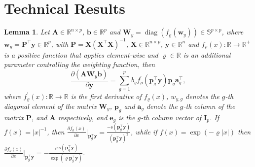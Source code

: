 \documentclass[a4paper, 12pt]{article}
\newcommand{\sgn}{\mathrm{s}}
\DeclareMathOperator{\diag}{diag}
\newcommand{\T}{\top}
\def\ba{\boldsymbol{a}}
\def\bb{\boldsymbol{b}}
\def\be{\boldsymbol{e}}
\def\bp{\boldsymbol{p}}
\def\bw{\boldsymbol{w}}
\def\by{\boldsymbol{y}}
\def\bA{\mathbf{A}}
\def\bI{\mathbf{I}}
\def\bP{\mathbf{P}}
\def\bW{\mathbf{W}}
\def\bX{\mathbf{X}}
\def\ba{\mathbf{a}}
\def\bb{\mathbf{b}}
\def\be{\mathbf{e}}
\def\bp{\mathbf{p}}
\def\bw{\mathbf{w}}
\def\by{\mathbf{y}}
\newtheorem{lemma}{Lemma}
\begin{document}
\section{Technical Results}
\label{sec:technical_app}
\begin{lemma}
\label{lemma:adalasso_weights_derivative}
Let $\bA\in\mathbb{R}^{n\times p}$, $\bb\in\mathbb{R}^{p}$ and $\bW_y=\diag(f_\varrho(\bw_y))\in\mathbb{S}^{p\times p}$, where $\bw_y=\bP^{\T}\by\in\mathbb{R}^{p}$, with $\bP=\bX(\bX^{\T}\bX)^{-1}$, $\bX\in\mathbb{R}^{n\times p}$, $\by\in\mathbb{R}^n$ and $f_\varrho(x):\mathbb{R}\rightarrow\mathbb{R}^+$ is a positive function that applies element-wise and $\varrho\in\mathbb{R}$ is an additional parameter controlling the weighting function, then
%
\begin{equation*}
\frac{\partial(\bA\bW_y\bb)}{\partial\by}=\sum_{g=1}^p b_g f_\varrho^{\prime}(\bp_g^{\T}\by) \bp_g\ba_g^{{\T}},
\end{equation*}
where $f_\varrho^\prime(x):\mathbb{R}\rightarrow\mathbb{R}$ is the first derivative of $f_\varrho(x)$, $w_{y,g}$ denotes the $g$-th diagonal element of the matrix $\bW_y$, $\bp_g$ and $\ba_g$ denote the $g$-th column of the matrix $\bP$, and $\bA$ respectively, and $\be_g$ is the $g$-th column vector of $\bI_p$. 
%
If $f(x)=\vert x\vert^{-1}$, then $\frac{\partial f_\varrho(x)}{\partial x}\Big\vert_{\bp_g^{\T}\by}=\frac{-\sgn(\bp_g^{\T}\by)}{(\bp_g^{\T}\by)^2}$, while if $f(x)=\exp{(-\varrho\vert x\vert)}$ then $\frac{\partial f_\varrho(x)}{\partial x}\Big\vert_{\bp_g^{\T}\by}=-\frac{\varrho\sgn(\bp_g^{\T}\by)}{\exp{(\varrho\bp_g^{\T}\by)}}$. 
\end{lemma}
\end{document}
